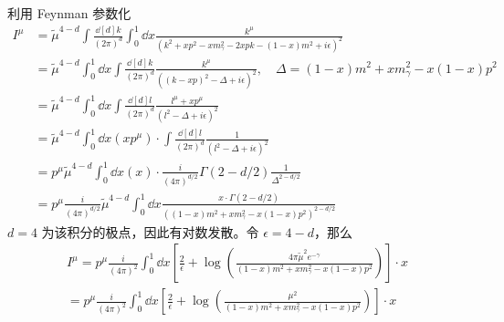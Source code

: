 利用 Feynman 参数化
\begin{equation}\label{qedlop_eq2}
\begin{aligned}
I^\mu 
&= \tilde{\mu}^{4-d} \int\frac{\dd[d]{k}}{(2\pi)^d}\int_0^1\dd x \frac{k^\mu}{(k^2+ xp^2-x m_\gamma^2-2xpk-(1-x)m^2 +i\epsilon)^2}\\
&=\tilde{\mu}^{4-d}\int_0^1\dd x\int\frac{\dd[d]{k}}{(2\pi)^d}  \frac{k^\mu}{((k-xp)^2-\Delta+i\epsilon)^2},\quad \Delta = (1-x)m^2+x m_\gamma^2-x(1-x)p^2\\
&=\tilde{\mu}^{4-d} \int_0^1 \dd x \int\frac{\dd[d]{l}}{(2\pi)^d} \frac{l^\mu + x p^\mu}{(l^2-\Delta+i\epsilon)^2}\\
&=\tilde{\mu}^{4-d} \int_0^1 \dd x(x p^\mu)\cdot\int \frac{\dd[d]{l}}{(2\pi)^d} \frac{1}{(l^2-\Delta+i\epsilon)^2}\\
&=p^\mu \tilde{\mu}^{4-d} \int_0^1 \dd x (x)\cdot \frac{i}{(4\pi)^{d/2}}\Gamma(2-d/2)\frac{1}{\Delta^{2-d/2}}\\
&=p^\mu \frac{i}{(4\pi)^{d/2}} \tilde{\mu}^{4-d} \int_0^1 \dd x \frac{x\cdot \Gamma(2-d/2)}{((1-x)m^2+x m_\gamma^2-x(1-x)p^2)^{2-d/2}}
\end{aligned}
\end{equation}
$d=4$ 为该积分的极点，因此有对数发散。令 $\epsilon = 4-d$，那么
\begin{equation}\label{qedlop_eq3}
\begin{aligned}
I^\mu = p^\mu \frac{i}{(4\pi)^2} \int_0^1 \dd x \left[\frac{2}{\epsilon}+\log\left(\frac{4\pi \tilde{\mu}^2 e^{-\gamma}}{(1-x)m^2+x m_\gamma^2 - x(1-x)p^2}\right)\right]\cdot x\\
= p^\mu \frac{i}{(4\pi)^2} \int_0^1 \dd x \left[\frac{2}{\epsilon}+\log\left(\frac{\mu^2}{(1-x)m^2+x m_\gamma^2 - x(1-x)p^2}\right)\right]\cdot x
\end{aligned}
\end{equation}
